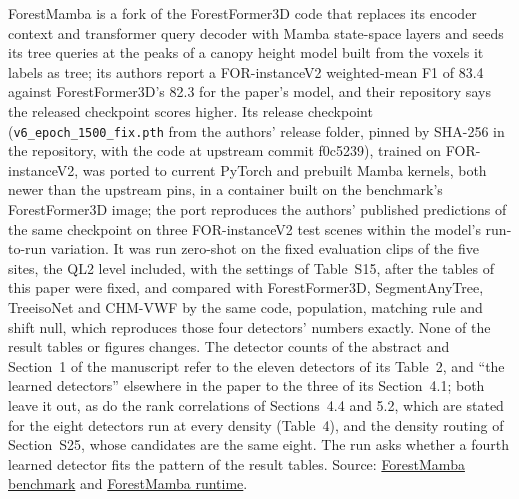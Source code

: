\documentclass[10pt,a4paper]{article}
\begin{document}
ForestMamba \citep{nguyen2026forestmamba} is a fork of the ForestFormer3D code that
replaces its encoder context and transformer query decoder with Mamba
state-space layers and seeds its tree queries at the peaks of a canopy height
model built from the voxels it labels as tree; its authors report a
FOR-instanceV2 weighted-mean F1 of 83.4 against ForestFormer3D's 82.3 for the
paper's model, and their repository says the released checkpoint scores higher.
Its release checkpoint (\texttt{v6\_epoch\_1500\_fix.pth} from the authors' release
folder, pinned by SHA-256 in the repository, with the code at upstream commit
f0c5239), trained on FOR-instanceV2, was ported to current PyTorch and prebuilt
Mamba kernels, both newer than the upstream pins, in a container built on the
benchmark's ForestFormer3D image; the port reproduces the authors' published
predictions of the same checkpoint on three FOR-instanceV2 test scenes within
the model's run-to-run variation. It was run zero-shot on the fixed evaluation
clips of the five sites, the QL2 level included, with the settings of Table~S15,
after the tables of this paper were fixed, and compared with ForestFormer3D,
SegmentAnyTree, TreeisoNet and CHM-VWF by the same code, population, matching
rule and shift null, which reproduces those four detectors' numbers exactly.
None of the result tables or figures changes. The detector counts of the
abstract and Section~1 of the manuscript refer to the eleven detectors of its
Table~2, and ``the learned detectors'' elsewhere in the paper to the three of its
Section~4.1; both leave it out, as do the rank correlations of Sections~4.4 and
5.2, which are stated for the eight detectors run at every density (Table~4),
and the density routing of Section~S25, whose candidates are the same eight. The
run asks whether a fourth learned detector fits the pattern of the result
tables. Source: \href{https://github.com/devakellc/lidar-tree-benchmark/blob/main/results/forestmamba-results.md}{ForestMamba benchmark} and
\href{https://github.com/devakellc/lidar-tree-benchmark/blob/main/gpu/forestmamba-sm120/README.md}{ForestMamba runtime}.
\end{document}
